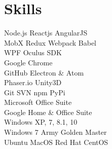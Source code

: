 \documentclass[]{resume}
\begin{document}
\begin{minipage}[t]{0.33\textwidth}
\sectionsep


\section{Skills}
Node.js \textbullet{} Reactjs \textbullet{} AngularJS \\
MobX \textbullet{} Redux \textbullet{} Webpack \textbullet{} Babel \\
WPF \textbullet{} Oculus SDK \\

Google Chrome \\
GitHub Electron \& Atom \\
Phaser.io \textbullet{} Unity3D \\

Git \textbullet{} SVN \textbullet{} npm \textbullet{} PyPi \\
Microsoft Office Suite \\
Google Home \& Office Suite \\

Windows XP, 7, 8.1, 10\\
Windows 7 Army Golden Master\\
Ubuntu \textbullet{} MacOS \textbullet{} Red Hat \textbullet{} CentOS \\

\sectionsep

%
%

\end{minipage}
\hfill
\end{document}
